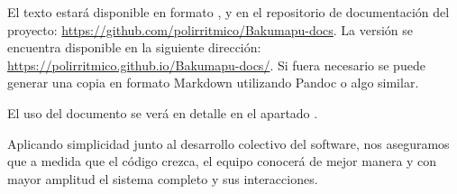 El texto estará disponible en formato ,  y  en el repositorio de documentación del proyecto: \url{https://github.com/polirritmico/Bakumapu-docs}. La versión  se encuentra disponible en la siguiente dirección: \url{https://polirritmico.github.io/Bakumapu-docs/}. Si fuera necesario se puede generar una copia en formato Markdown utilizando Pandoc o algo similar.

El uso del documento se verá en detalle en el apartado .


Aplicando simplicidad junto al desarrollo colectivo del software, nos aseguramos que a medida que el código crezca, el equipo conocerá de mejor manera y con mayor amplitud el sistema completo y sus interacciones.


